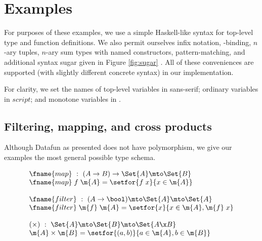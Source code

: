 \documentclass[preprint]{sigplanconf}
\newcommand{\uto}{\to}
\begin{document}

\section{Examples}

For purposes of these examples, we use a simple Haskell-like syntax for
top-level type and function definitions. We also permit ourselves infix
notation, -binding, $n$-ary tuples, $n$-ary sum types with named
constructors, pattern-matching, and additional syntax sugar given
in Figure \ref{fig:sugar} .
All of these conveniences are supported (with slightly different concrete
syntax) in our implementation.

For clarity, we set the names of top-level variables in \textsf{sans-serif};
ordinary variables in $script$; and monotone variables in .




\subsection{Filtering, mapping, and cross products}

Although Datafun as presented does not have polymorphism, we give our examples
the most general possible type schema. 


\[\begin{array}{l}
\fname{map} ~:~ (A \uto B) \to \Set{A} \mto \Set{B}\\
\fname{map}\;f\;\m{A} = \setfor{f\;x}{x \in \m{A}}\\
\\
\fname{filter} ~:~ (A \uto \bool) \mto \Set{A} \mto \Set{A}\\
\fname{filter}\;\m{f}\;\m{A} = \setfor{x}{x \in \m{A}, \m{f}\; x}\\
\\
(\times) ~:~ \Set{A} \mto \Set{B} \mto \Set{A \x B}\\
\m{A} \times \m{B} = \setfor{(a,b)}{a \in \m{A}, b \in \m{B}}
\end{array}\]
\end{document}
